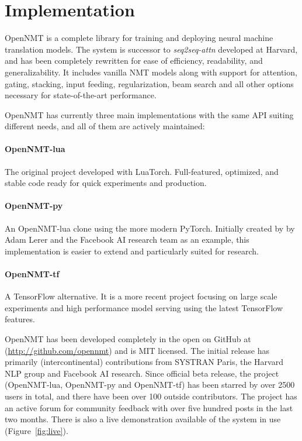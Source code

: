 \documentclass[]{article}
\begin{document}
\section{Implementation}

OpenNMT is a complete library for training and deploying neural
machine translation models. The system is successor to
\textit{seq2seq-attn} developed at Harvard, and has been completely
rewritten for ease of efficiency, readability, and
generalizability. It includes vanilla NMT models along with support
for attention, gating, stacking, input feeding, regularization, beam
search and all other options necessary for state-of-the-art
performance.  

OpenNMT has currently three main implementations with the same API suiting different needs, and all of them are actively maintained:

\paragraph{OpenNMT-lua} The original project developed with LuaTorch.
    Full-featured, optimized, and stable code ready for quick experiments and production.
\paragraph{OpenNMT-py} An OpenNMT-lua clone using the more modern PyTorch.
    Initially created by by Adam
Lerer and the Facebook AI research team as an example, this implementation is easier to extend and particularly suited for research.
\paragraph{OpenNMT-tf} A TensorFlow alternative.
    It is a more recent project focusing on large scale experiments and high performance model serving using the latest TensorFlow features.


OpenNMT has been developed completely in the open on GitHub at
(\url{http://github.com/opennmt}) and is MIT licensed.  The
initial release has primarily (intercontinental) contributions from
SYSTRAN Paris, the Harvard NLP group and Facebook AI research. Since official beta release,
the project (OpenNMT-lua, OpenNMT-py and OpenNMT-tf) has been starred by over 2500 users in total, and there have been
over 100 outside contributors. The
project has an active forum for community feedback with over five
hundred posts in the last two months. There is also a live
demonstration available of the system in use (Figure~\ref{fig:live}).
\end{document}
